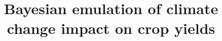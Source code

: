
\newcommand{\bt}{{\bf t}}
\newcommand{\bB}{{\bf B}}
\newcommand{\tbSigma}{{\tilde {\bf \Sigma}}}
\newcommand{\tbu}{{\tilde {\bf u}}}
\newcommand{\tbU}{{\tilde {\bf U}}}
\newcommand{\bh}{{\bf h}}
\newcommand{\bH}{{\bf H}}
\newcommand{\bD}{{\bf D}}
\newcommand{\bU}{{\bf U}}
\newcommand{\bu}{{\bf u}}
\newcommand{\bZ}{{\bf Z}}
\newcommand{\bz}{{\bf z}}
\newcommand{\bC}{{\bf C}}
\newcommand{\bc}{{\bf c}}
\newcommand{\bx}{{\bf x}}
\newcommand{\bX}{{\bf X}}
\newcommand{\by}{{\bf y}}
\newcommand{\bY}{{\bf Y}}
\newcommand{\bE}{{\bf E}}
\newcommand{\bW}{{\bf W}}
\newcommand{\tbx}{{\tilde {\bf x}}}
\newcommand{\tbX}{{\tilde {\bf X}}}
\newcommand{\tby}{{\tilde {\bf y}}}
\newcommand{\tbY}{{\tilde {\bf Y}}}
\newcommand{\hbX}{{\hat {\bf X}}}
\newcommand{\hbY}{{\hat {\bf Y}}}
\newcommand{\hby}{{\hat {\bf y}}}
\newcommand{\ty}{{\tilde {y}}}
\newcommand{\hy}{{\hat {y}}}

\newcommand{\bGamma}{{\boldsymbol{\Gamma}}}
\newcommand{\tbGamma}{{\tilde{\boldsymbol{\Gamma}}}}
\newcommand{\hbGamma}{{\hat{\boldsymbol{\Gamma}}}}

\newcommand{\bgamma}{{\boldsymbol{\gamma}}}
\newcommand{\bepsilon}{{\boldsymbol{\varepsilon}}}
\newcommand{\tbepsilon}{{\tilde{\boldsymbol{\varepsilon}}}}
\newcommand{\hbepsilon}{{\hat{\boldsymbol{\varepsilon}}}}
\newcommand{\bbeta}{{\boldsymbol{\beta}}}
\newcommand{\hbbeta}{{\hat{\boldsymbol{\beta}}}}
\renewcommand{\epsilon}{\varepsilon}









\DeclareMathOperator*{\ssum}{{\textstyle \sum}}


%

%
\title{Bayesian emulation of climate change impact on crop yields%
}

